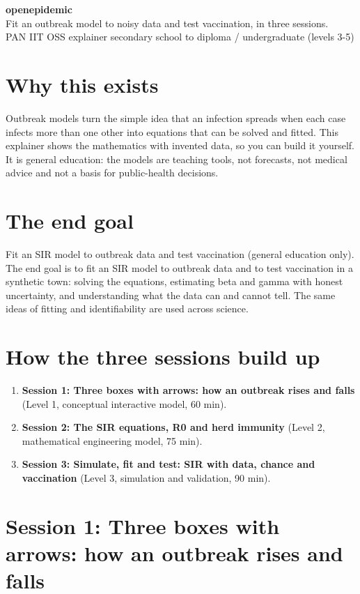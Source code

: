 \documentclass[11pt,a4paper]{article}
\begin{document}
\begin{center}{\LARGE\bfseries openepidemic}\\[0.4em]{\large Fit an outbreak model to noisy data and test vaccination, in three sessions.}\\[0.2em]\small PAN IIT OSS explainer \textbullet{} secondary school to diploma / undergraduate (levels 3-5)\end{center}

\section*{Why this exists}
Outbreak models turn the simple idea that an infection spreads when each case infects more than one other into equations that can be solved and fitted. This explainer shows the mathematics with invented data, so you can build it yourself. It is general education: the models are teaching tools, not forecasts, not medical advice and not a basis for public-health decisions.

\section*{The end goal}
Fit an SIR model to outbreak data and test vaccination (general education only). The end goal is to fit an SIR model to outbreak data and to test vaccination in a synthetic town: solving the equations, estimating beta and gamma with honest uncertainty, and understanding what the data can and cannot tell. The same ideas of fitting and identifiability are used across science.

\section*{How the three sessions build up}
\begin{enumerate}[nosep]
\item \textbf{Session 1: Three boxes with arrows: how an outbreak rises and falls} (Level 1, conceptual interactive model, 60 min).
\item \textbf{Session 2: The SIR equations, R0 and herd immunity} (Level 2, mathematical engineering model, 75 min).
\item \textbf{Session 3: Simulate, fit and test: SIR with data, chance and vaccination} (Level 3, simulation and validation, 90 min).
\end{enumerate}

\section{Session 1: Three boxes with arrows: how an outbreak rises and falls}
\end{document}
